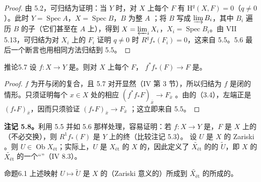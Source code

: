 \begin{proof}
由 5.2，可归结为证明：当 $Y$ 时，对 $X$ 上每个 $F$ 有 $\mathrm H^q(X,F)=0$（$q\ne0$）。此时 $Y=\operatorname{Spec}A$，$X=\operatorname{Spec}B$，$B$ 为整 $A$ ；将 $B$ 写成 $\varinjlim B_i$，其中 $B_i$ 遍历 $B$ 的子（它们甚至在 $A$ 上），得到 $X=\varprojlim_iX_i$，$X_i=\operatorname{Spec}B_i$。由 VII 5.13，可归结为对 $X_i$ 上的 $F_i$ 证明 $q\ne0$ 时 $R^qf_*(F_i)=0$，这来自 5.5。5.6 最后一个断言也用相同方法归结到 5.5。
\end{proof}
\begin{SGAresult}{推论}{5.7}
设 $f:X\to Y$ 是。则对 $X$ 上每个 $F$， $f^*f_*(F)\to F$ 是。
\end{SGAresult}
\begin{proof}
$f$ 为开与闭的复合，且 5.7 对开显然（IV 第 3 节），所以归结为 $f$ 是闭的情形。只须证明每个 $x\in X$ 处的相应 $(f^*f_*F)_{\bar x}\to F_{\bar x}$ 。由的（3.4），左端正是 $(f_*F)_{\bar x}$，因而只须验证 $(f_*F)_{\bar x}\to F_{\bar x}$ ；这立即来自 5.5。
\end{proof}
\textbf{注记 5.8。}利用 5.5 并如 5.6 那样处理，容易证明：若 $f:X\to Y$ 是，$F$ 是 $X$ 上的（不必交换），则 $R^1f_*(F)$ 是 $Y$ 上的终（比较注记 5.3）。
设 $U$ 是 $X$ 的 Zariski 。则 $U\in\operatorname{Ob}X_{\text{ét}}$；实际上，$U$ 是 $X_{\text{ét}}$ 的 $X$ 的，因此定义了 $\widetilde{X_{\text{ét}}}$ 的的 $\widetilde U$，即 $X$ 的 $\widetilde{X_{\text{ét}}}$ 的一个“”（IV 8.3）。
\begin{SGAresult}{命题}{6.1}
上述映射 $U\mapsto\widetilde U$ 是 $X$ 的（Zariski 意义的）所成到 $\widetilde{X_{\text{ét}}}$ 的所成的。
\end{SGAresult}
